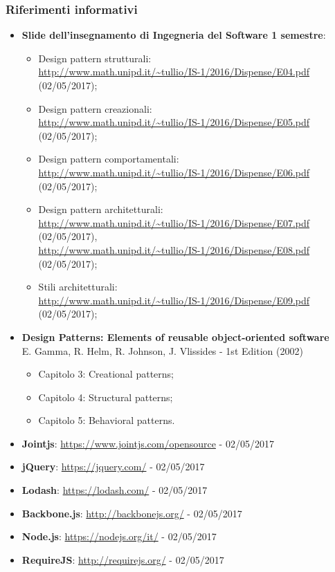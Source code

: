 \documentclass[../PianoDiQualifica.tex]{subfiles}
\begin{document}
			\subsubsection{Riferimenti informativi}	
				\begin{itemize}
					\item \textbf{Slide dell'insegnamento di Ingegneria del Software
					1 semestre}:
					\begin{itemize}
						\item Design pattern strutturali:\\
						\url{http://www.math.unipd.it/~tullio/IS-1/2016/Dispense/E04.pdf} (02/05/2017);
						\item Design pattern creazionali:\\
						\url{http://www.math.unipd.it/~tullio/IS-1/2016/Dispense/E05.pdf} (02/05/2017);
						\item Design pattern comportamentali:\\
						\url{http://www.math.unipd.it/~tullio/IS-1/2016/Dispense/E06.pdf} (02/05/2017);
						\item Design pattern architetturali:\\
						\url{http://www.math.unipd.it/~tullio/IS-1/2016/Dispense/E07.pdf} (02/05/2017),\\
						\url{http://www.math.unipd.it/~tullio/IS-1/2016/Dispense/E08.pdf} (02/05/2017);
						\item Stili architetturali:\\
						\url{http://www.math.unipd.it/~tullio/IS-1/2016/Dispense/E09.pdf} (02/05/2017);
					\end{itemize}
					\item \textbf{Design Patterns: Elements of reusable object-oriented software}\\
					E. Gamma, R. Helm, R. Johnson, J. Vlissides - 1st Edition (2002)
					\begin{itemize}
						\item Capitolo 3: Creational patterns;
						\item Capitolo 4: Structural patterns;
						\item Capitolo 5: Behavioral patterns.
					\end{itemize}
					\item \textbf{Jointjs}: \url{https://www.jointjs.com/opensource} - 02/05/2017
					\item \textbf{jQuery}: \url{https://jquery.com/} - 02/05/2017
					\item \textbf{Lodash}: \url{https://lodash.com/} - 02/05/2017
					\item \textbf{Backbone.js}: \url{http://backbonejs.org/} - 02/05/2017
					\item \textbf{Node.js}: \url{https://nodejs.org/it/} - 02/05/2017
					\item \textbf{RequireJS}: \url{http://requirejs.org/} - 02/05/2017
				\end{itemize}
\end{document}

